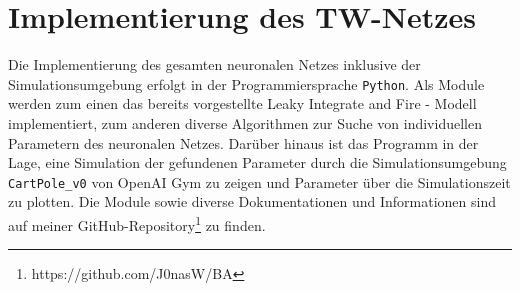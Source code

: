 %
\chapter{Implementierung des TW-Netzes}
\label{chap:imp}
%

	Die Implementierung des gesamten neuronalen Netzes inklusive der Simulationsumgebung erfolgt in der Programmiersprache \texttt{Python}. Als Module werden zum einen das bereits vorgestellte Leaky Integrate and Fire - Modell implementiert, zum anderen diverse Algorithmen zur Suche von individuellen Parametern des neuronalen Netzes. Darüber hinaus ist das Programm in der Lage, eine Simulation der gefundenen Parameter durch die Simulationsumgebung \texttt{CartPole\_v0} von OpenAI Gym zu zeigen und Parameter über die Simulationszeit zu plotten. Die Module sowie diverse Dokumentationen und Informationen sind auf meiner GitHub-Repository\footnote{https://github.com/J0nasW/BA} \cite{BA} zu finden.\\
		

